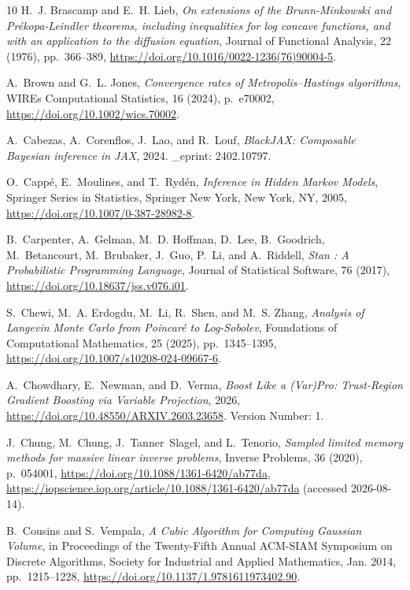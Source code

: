 \documentclass[onefignum,onetabnum]{siamonline250211}
\begin{document}
\begin{thebibliography}{10}
{\sc H.~J. Brascamp and E.~H. Lieb}, {\em On extensions of the
  {Brunn}-{Minkowski} and {Prékopa}-{Leindler} theorems, including
  inequalities for log concave functions, and with an application to the
  diffusion equation}, Journal of Functional Analysis, 22 (1976), pp.~366--389,
  \url{https://doi.org/10.1016/0022-1236(76)90004-5}.

{\sc A.~Brown and G.~L. Jones}, {\em Convergence rates of
  {Metropolis}–{Hastings} algorithms}, WIREs Computational Statistics, 16
  (2024), p.~e70002, \url{https://doi.org/10.1002/wics.70002}.

{\sc A.~Cabezas, A.~Corenflos, J.~Lao, and R.~Louf}, {\em {BlackJAX}:
  {Composable} {Bayesian} inference in {JAX}}, 2024.
\newblock \_eprint: 2402.10797.

{\sc O.~Cappé, E.~Moulines, and T.~Rydén}, {\em Inference in {Hidden}
  {Markov} {Models}}, Springer {Series} in {Statistics}, Springer New York, New
  York, NY, 2005, \url{https://doi.org/10.1007/0-387-28982-8}.

{\sc B.~Carpenter, A.~Gelman, M.~D. Hoffman, D.~Lee, B.~Goodrich,
  M.~Betancourt, M.~Brubaker, J.~Guo, P.~Li, and A.~Riddell}, {\em
  \textit{{Stan}} : {A} {Probabilistic} {Programming} {Language}}, Journal of
  Statistical Software, 76 (2017), \url{https://doi.org/10.18637/jss.v076.i01}.

{\sc S.~Chewi, M.~A. Erdogdu, M.~Li, R.~Shen, and M.~S. Zhang}, {\em Analysis
  of {Langevin} {Monte} {Carlo} from {Poincaré} to {Log}-{Sobolev}},
  Foundations of Computational Mathematics, 25 (2025), pp.~1345--1395,
  \url{https://doi.org/10.1007/s10208-024-09667-6}.

{\sc A.~Chowdhary, E.~Newman, and D.~Verma}, {\em Boost {Like} a ({Var}){Pro}:
  {Trust}-{Region} {Gradient} {Boosting} via {Variable} {Projection}}, 2026,
  \url{https://doi.org/10.48550/ARXIV.2603.23658}.
\newblock Version Number: 1.

{\sc J.~Chung, M.~Chung, J.~Tanner~Slagel, and L.~Tenorio}, {\em Sampled
  limited memory methods for massive linear inverse problems}, Inverse
  Problems, 36 (2020), p.~054001,
  \url{https://doi.org/10.1088/1361-6420/ab77da},
  \url{https://iopscience.iop.org/article/10.1088/1361-6420/ab77da} (accessed
  2026-08-14).

{\sc B.~Cousins and S.~Vempala}, {\em A {Cubic} {Algorithm} for {Computing}
  {Gaussian} {Volume}}, in Proceedings of the {Twenty}-{Fifth} {Annual}
  {ACM}-{SIAM} {Symposium} on {Discrete} {Algorithms}, Society for Industrial
  and Applied Mathematics, Jan. 2014, pp.~1215--1228,
  \url{https://doi.org/10.1137/1.9781611973402.90}.


\end{thebibliography}
\end{document}
